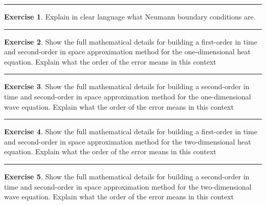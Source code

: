 \documentclass[
]{book}
\theoremstyle{definition}
\theoremstyle{definition}
\theoremstyle{definition}
\newtheorem{exercise}{Exercise}[chapter]
\theoremstyle{remark}
\begin{document}
\begin{center}\rule{0.5\linewidth}{0.5pt}\end{center}

\begin{exercise}
\protect\hypertarget{exr:unnamed-chunk-606}{}{\label{exr:unnamed-chunk-606} }Explain in clear language what Neumann boundary conditions are.
\end{exercise}

\begin{center}\rule{0.5\linewidth}{0.5pt}\end{center}

\begin{exercise}
\protect\hypertarget{exr:unnamed-chunk-607}{}{\label{exr:unnamed-chunk-607} }Show the full mathematical details for building a first-order in time
and second-order in space approximation method for the one-dimensional
heat equation. Explain what the order of the error means in this context
\end{exercise}

\begin{center}\rule{0.5\linewidth}{0.5pt}\end{center}

\begin{exercise}
\protect\hypertarget{exr:unnamed-chunk-608}{}{\label{exr:unnamed-chunk-608} }Show the full mathematical details for building a second-order in time
and second-order in space approximation method for the one-dimensional
wave equation. Explain what the order of the error means in this context
\end{exercise}

\begin{center}\rule{0.5\linewidth}{0.5pt}\end{center}

\begin{exercise}
\protect\hypertarget{exr:unnamed-chunk-609}{}{\label{exr:unnamed-chunk-609} }Show the full mathematical details for building a first-order in time
and second-order in space approximation method for the two-dimensional
heat equation. Explain what the order of the error means in this context
\end{exercise}

\begin{center}\rule{0.5\linewidth}{0.5pt}\end{center}

\begin{exercise}
\protect\hypertarget{exr:unnamed-chunk-610}{}{\label{exr:unnamed-chunk-610} }Show the full mathematical details for building a second-order in time
and second-order in space approximation method for the two-dimensional
wave equation. Explain what the order of the error means in this context
\end{exercise}
\end{document}
